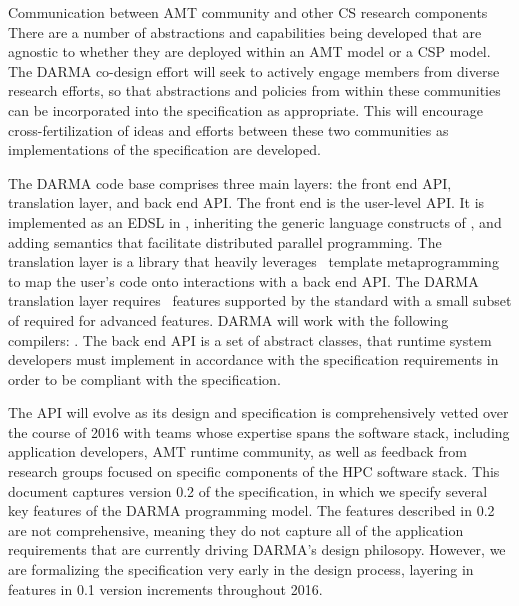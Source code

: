 \begin{compactdesc}
\item[Communication between AMT community and other CS research components]
There are a number of abstractions and capabilities being developed that are
agnostic to whether they are deployed within an \gls{AMT} model or a \gls{CSP} model.
The DARMA co-design effort will seek to actively engage members from diverse
research efforts, so that abstractions and policies from within these communities can be
incorporated into the specification as appropriate.
 This will encourage cross-fertilization of ideas and efforts between these two
 communities as implementations of the specification are developed.
\end{compactdesc}

The DARMA code base comprises three main layers: the \gls{front end} \gls{API},
\gls{translation layer}, and
\gls{back end} \gls{API}.  The \gls{front end} is the user-level \gls{API}.  It
is implemented as an \gls{EDSL} in \CC,  inheriting the generic language
constructs of \CC, and adding \gls{semantics} that facilitate distributed
parallel programming.
The \gls{translation layer} is a library that heavily leverages \CC\ \gls{template metaprogramming} 
to map the user's code onto interactions with a \gls{back end} \gls{API}.  
The DARMA \gls{translation layer} requires \CC\ features supported by the 
standard with a small subset of  required for advanced features. 
DARMA will work with the following compilers: .
The \gls{back end} \gls{API} is a set of abstract classes, that runtime system
developers must implement in accordance with the specification requirements in
order to be compliant with the specification.

The \gls{API} will evolve as its design and specification is comprehensively vetted over
the course of 2016 with teams whose expertise spans the software stack,
including application
developers, \gls{AMT} runtime community, as well as feedback from
research groups focused on specific components of the \gls{HPC} software stack.
This document captures version 0.2 of the specification, in which we 
specify several key features of the DARMA programming model. The features
described in 0.2 are not comprehensive, meaning they do not capture all of the
application requirements that are currently driving DARMA's design philosopy. 
However, we are formalizing the specification very early in the
design process, layering in features in 0.1 version increments throughout 2016.




